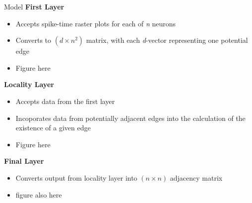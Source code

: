 \documentclass[12pt]{article}
\begin{document}
\begin{posterbard}
\begin{posterbox}
		\vspace{\baselineskip}
	\end{posterbox}
	\begin{posterboxtitle}{Model}
		\noindent\textbf{First Layer}
		\begin{itemize}
			\item Accepts spike-time raster plots for each of \textit{n} neurons
			\item Converts to $(d \times n^2)$ matrix, with each 
				\textit{d}-vector representing one potential edge
			\item Figure here
		\end{itemize}
		\noindent\textbf{Locality Layer}
		\begin{itemize}
			\item Accepts data from the first layer
			\item Incoporates data from potentially adjacent edges into the 
				calculation of the existence of a given edge
			\item Figure here
		\end{itemize}
		\noindent\textbf{Final Layer}
		\begin{itemize}
			\item Converts output from locality layer into $(n \times n)$ 
				adjacency matrix
			\item figure also here
		\end{itemize}
	\end{posterboxtitle}


\end{posterbard}
\end{document}
